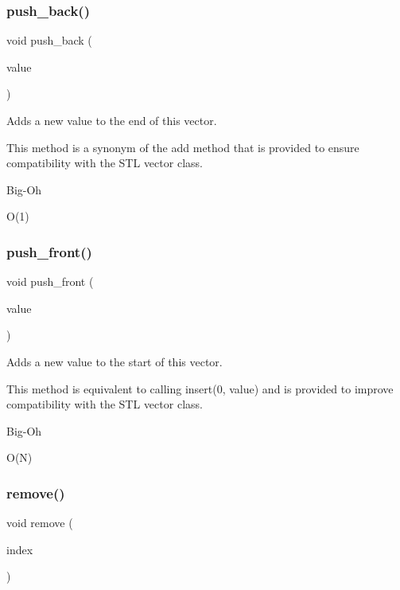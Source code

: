 \subsubsection{\texorpdfstring{push\+\_\+back()}{push\_back()}}
{\footnotesize\ttfamily void push\+\_\+back (\begin{DoxyParamCaption}\item[{const Value\+Type \&}]{value }\end{DoxyParamCaption})}



Adds a new value to the end of this vector. 

This method is a synonym of the add method that is provided to ensure compatibility with the S\+TL {\ttfamily vector} class. \begin{DoxyRefDesc}{Big-\/\+Oh}
\item[\mbox{\hyperlink{BigOh__BigOh000124}{Big-\/\+Oh}}]O(1) \end{DoxyRefDesc}
\mbox{\label{classVector_a9737dc314198d1cf306325134f000c5a}} 
\subsubsection{\texorpdfstring{push\+\_\+front()}{push\_front()}}
{\footnotesize\ttfamily void push\+\_\+front (\begin{DoxyParamCaption}\item[{const Value\+Type \&}]{value }\end{DoxyParamCaption})}



Adds a new value to the start of this vector. 

This method is equivalent to calling insert(0, value) and is provided to improve compatibility with the S\+TL {\ttfamily vector} class. \begin{DoxyRefDesc}{Big-\/\+Oh}
\item[\mbox{\hyperlink{BigOh__BigOh000125}{Big-\/\+Oh}}]O(\+N) \end{DoxyRefDesc}
\mbox{\label{classVector_a2ad1aa316f278b2e9fa8121504749652}} 
\subsubsection{\texorpdfstring{remove()}{remove()}}
{\footnotesize\ttfamily void remove (\begin{DoxyParamCaption}\item[{int}]{index }\end{DoxyParamCaption})}



